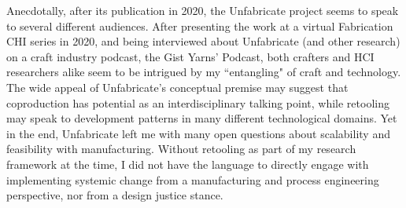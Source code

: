 Anecdotally, after its publication in 2020, the Unfabricate project seems to speak to several different audiences. After presenting the work at a virtual Fabrication \@ CHI series in 2020, and being interviewed about Unfabricate (and other research) on a craft industry podcast, the Gist Yarns' Podcast, both crafters and HCI researchers alike seem to be intrigued by my ``entangling" of craft and technology. The wide appeal of Unfabricate's conceptual premise may suggest that coproduction has potential as an interdisciplinary talking point, while retooling may speak to development patterns in many different technological domains. Yet in the end, Unfabricate left me with many open questions about scalability and feasibility with manufacturing. Without retooling as part of my research framework at the time, I did not have the language to directly engage with implementing systemic change from a manufacturing and process engineering perspective, nor from a design justice stance.
